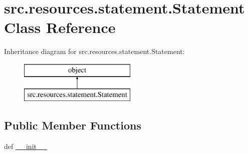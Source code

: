 \hypertarget{classsrc_1_1resources_1_1statement_1_1_statement}{\section{src.\+resources.\+statement.\+Statement Class Reference}
\label{classsrc_1_1resources_1_1statement_1_1_statement}
}
Inheritance diagram for src.\+resources.\+statement.\+Statement\+:\begin{figure}[H]
\begin{center}
\leavevmode
\includegraphics[height=2.000000cm]{classsrc_1_1resources_1_1statement_1_1_statement}
\end{center}
\end{figure}
\subsection*{Public Member Functions}
\begin{DoxyCompactItemize}
\item 
def \hyperlink{classsrc_1_1resources_1_1statement_1_1_statement_a5082946d2424547c1b2613b98e13a674}{\+\_\+\+\_\+init\+\_\+\+\_\+}
\end{DoxyCompactItemize}
